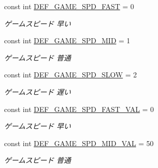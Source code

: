 \begin{DoxyCompactItemize}
const int \hyperlink{class_reversi_form_1_1_reversi_const_a9a31385192f066c204e6f2184053f0fb}{D\+E\+F\+\_\+\+G\+A\+M\+E\+\_\+\+S\+P\+D\+\_\+\+F\+A\+ST} = 0
\begin{DoxyCompactList}\small\item\em ゲームスピード 早い \end{DoxyCompactList}\item 
\mbox{\label{class_reversi_form_1_1_reversi_const_a9091a98d585b1038089dfee667ab3428}} 
const int \hyperlink{class_reversi_form_1_1_reversi_const_a9091a98d585b1038089dfee667ab3428}{D\+E\+F\+\_\+\+G\+A\+M\+E\+\_\+\+S\+P\+D\+\_\+\+M\+ID} = 1
\begin{DoxyCompactList}\small\item\em ゲームスピード 普通 \end{DoxyCompactList}\item 
\mbox{\label{class_reversi_form_1_1_reversi_const_a7cc25b7176a534d0f16214933849389d}} 
const int \hyperlink{class_reversi_form_1_1_reversi_const_a7cc25b7176a534d0f16214933849389d}{D\+E\+F\+\_\+\+G\+A\+M\+E\+\_\+\+S\+P\+D\+\_\+\+S\+L\+OW} = 2
\begin{DoxyCompactList}\small\item\em ゲームスピード 遅い \end{DoxyCompactList}\item 
\mbox{\label{class_reversi_form_1_1_reversi_const_a4196039f1e23b030738203d29b7d1e1c}} 
const int \hyperlink{class_reversi_form_1_1_reversi_const_a4196039f1e23b030738203d29b7d1e1c}{D\+E\+F\+\_\+\+G\+A\+M\+E\+\_\+\+S\+P\+D\+\_\+\+F\+A\+S\+T\+\_\+\+V\+AL} = 0
\begin{DoxyCompactList}\small\item\em ゲームスピード 早い \end{DoxyCompactList}\item 
\mbox{\label{class_reversi_form_1_1_reversi_const_aed26d5ee8a8ac88690436ab4be759748}} 
const int \hyperlink{class_reversi_form_1_1_reversi_const_aed26d5ee8a8ac88690436ab4be759748}{D\+E\+F\+\_\+\+G\+A\+M\+E\+\_\+\+S\+P\+D\+\_\+\+M\+I\+D\+\_\+\+V\+AL} = 50
\begin{DoxyCompactList}\small\item\em ゲームスピード 普通 \end{DoxyCompactList}\item 

\end{DoxyCompactItemize}
